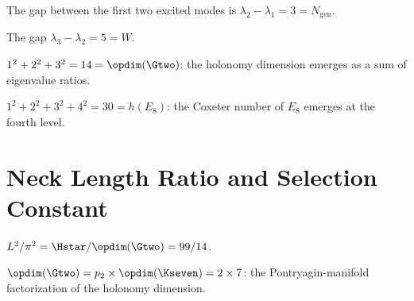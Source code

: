 \begin{theorem}[Second spectral gap $= N_{\mathrm{gen}}$]\label{thm:second_gap_Ngen}
    \leanok
    The gap between the first two excited modes is
    $\lambda_2 - \lambda_1 = 3 = N_{\mathrm{gen}}$.
\end{theorem}

\begin{theorem}[Third spectral gap $=$ Weyl factor]\label{thm:third_gap_Weyl}
    \leanok
    The gap $\lambda_3 - \lambda_2 = 5 = W$.
\end{theorem}

\begin{theorem}[Eigenvalue sum $= \opdim(\Gtwo)$]\label{thm:ev_sum_dim_G2}
    \leanok
    $1^2 + 2^2 + 3^2 = 14 = \opdim(\Gtwo)$: the holonomy dimension emerges
    as a sum of eigenvalue ratios.
\end{theorem}

\begin{theorem}[Eigenvalue sum $= h(E_8)$]\label{thm:ev_sum_coxeter_E8}
    \leanok
    $1^2 + 2^2 + 3^2 + 4^2 = 30 = h(E_8)$: the Coxeter number of $E_8$
    emerges at the fourth level.
\end{theorem}

\section{Neck Length Ratio and Selection Constant}

\begin{theorem}\label{thm:neck_ratio}
    \leanok
    $L^2/\pi^2 = \Hstar/\opdim(\Gtwo) = 99/14$.
\end{theorem}

\begin{theorem}\label{thm:kappa_structure}
    \leanok
    $\opdim(\Gtwo) = p_2 \times \opdim(\Kseven) = 2 \times 7$: the Pontryagin-manifold
    factorization of the holonomy dimension.
\end{theorem}

